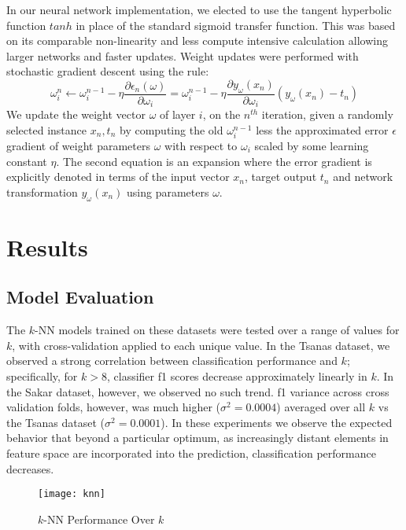 \documentclass[12pt]{article}
\begin{document}
In our neural network implementation, we elected to use the tangent hyperbolic function $tanh$ in place of the standard sigmoid transfer function. This was based on its comparable non-linearity and less compute intensive calculation allowing larger networks and faster updates. Weight updates were performed with stochastic gradient descent using the rule:
\begin{equation}
\omega_i^n \leftarrow \omega_i^{n-1}-\eta \frac{\partial\epsilon_n(\omega)}{\partial\omega_i} = \omega_i^{n-1}-\eta \frac{\partial y_\omega(x_n)}{\partial \omega_i}(y_\omega(x_n)-t_n)
\end{equation}
We update the weight vector $\omega$ of layer $i$, on the $n^{th}$ iteration, given a randomly selected instance $x_n,t_n$ by computing the old $\omega_i^{n-1}$ less the approximated error $\epsilon$ gradient of weight parameters $\omega$ with respect to $\omega_i$ scaled by some learning constant $\eta$. The second equation is an expansion where the error gradient is explicitly denoted in terms of the input vector $x_n$, target output $t_n$ and network transformation $y_\omega(x_n)$ using parameters $\omega$.

\section{Results}
\subsection{Model Evaluation}
The $k$-NN models trained on these datasets were tested over a range of values for $k$, with cross-validation applied to each unique value. In the Tsanas dataset, we observed a strong correlation between classification performance and $k$; specifically, for $k > 8$, classifier f1 scores decrease approximately linearly in $k$. In the Sakar dataset, however, we observed no such trend. f1 variance across cross validation folds, however, was much higher ($\sigma^2=0.0004$) averaged over all $k$ vs the Tsanas dataset ($\sigma^2=0.0001$). In these experiments we observe the expected behavior that beyond a particular optimum, as  increasingly distant elements in feature space are incorporated into the prediction, classification performance decreases.
\begin{figure}
    \centering
    \texttt{[image: knn]}
    \caption{$k$-NN Performance Over $k$}
\end{figure}
\end{document}
